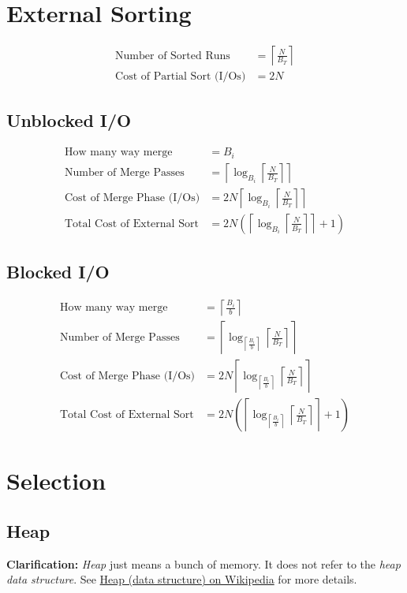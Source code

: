 \documentclass{article}
\newcommand{\ceil}[1]{\left\lceil#1\right\rceil}
\newcommand{\paren}[1]{\left(#1\right)}
\begin{document}
\section{External Sorting}
\label{sec:externalsorting}

\begin{align}
  \text{Number of Sorted Runs} &= \ceil{\frac{N}{B_T}}\\
  \text{Cost of Partial Sort (I/Os)} &= 2N
\end{align}

\subsection{Unblocked I/O}
\begin{align}
  \text{How many way merge} &= B_i \\
  \text{Number of Merge Passes} &= \ceil{\log_{B_i}\ceil{\frac{N}{B_T}}} \\
  \text{Cost of Merge Phase (I/Os)} &= 2N\ceil{\log_{B_i}\ceil{\frac{N}{B_T}}} \\
  \text{Total Cost of External Sort} &= 2N\paren{\ceil{\log_{B_i}\ceil{\frac{N}{B_T}}} + 1}
\end{align}

\subsection{Blocked I/O}
\begin{align}
  \text{How many way merge} &= \ceil{\frac{B_i}{b}} \\
  \text{Number of Merge Passes} &= \ceil{\log_{\ceil{\frac{B_i}{b}}}\ceil{\frac{N}{B_T}}} \\
  \text{Cost of Merge Phase (I/Os)} &= 2N\ceil{\log_{\ceil{\frac{B_i}{b}}}\ceil{\frac{N}{B_T}}} \\
  \text{Total Cost of External Sort} &= 2N\paren{\ceil{\log_{\ceil{\frac{B_i}{b}}}\ceil{\frac{N}{B_T}}} + 1}
\end{align}

\section{Selection}
\label{sec:selection}
\subsection{Heap}

\textbf{Clarification:} \textit{Heap} just means a bunch of memory. It
does not refer to the \textit{heap data structure}. See
\href{http://en.wikipedia.org/wiki/Heap\_(data\_structure)}{Heap (data
  structure) on Wikipedia} for more details.
\end{document}
